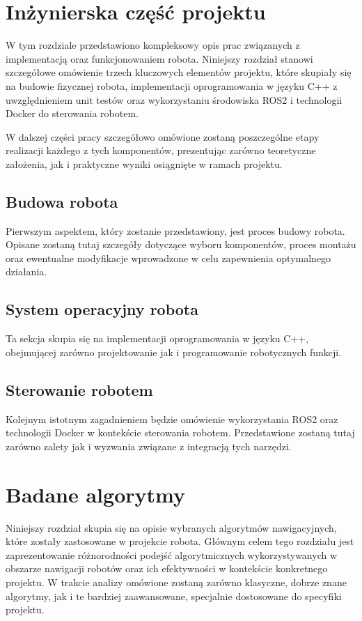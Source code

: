 \documentclass[12pt,twoside]{article}
\begin{document}
\section{Inżynierska część projektu}

W tym rozdziale przedstawiono kompleksowy opis prac związanych z implementacją oraz funkcjonowaniem robota. Niniejszy rozdział stanowi szczegółowe omówienie trzech kluczowych elementów projektu, które skupiały się na budowie fizycznej robota, implementacji oprogramowania w języku C++ z uwzględnieniem unit testów oraz wykorzystaniu środowiska ROS2 i technologii Docker do sterowania robotem.

W dalszej części pracy szczegółowo omówione zostaną poszczególne etapy realizacji każdego z tych komponentów, prezentując zarówno teoretyczne założenia, jak i praktyczne wyniki osiągnięte w ramach projektu.

\subsection{Budowa robota}

Pierwszym aspektem, który zostanie przedstawiony, jest proces budowy robota. Opisane zostaną tutaj szczegóły dotyczące wyboru komponentów, proces montażu oraz ewentualne modyfikacje wprowadzone w celu zapewnienia optymalnego działania.

\subsection{System operacyjny robota}

Ta sekcja skupia się na implementacji oprogramowania w języku C++, obejmującej zarówno projektowanie jak i programowanie robotycznych funkcji. 

\subsection{Sterowanie robotem}

Kolejnym istotnym zagadnieniem będzie omówienie wykorzystania ROS2 oraz technologii Docker w kontekście sterowania robotem. Przedstawione zostaną tutaj zarówno zalety jak i wyzwania związane z integracją tych narzędzi.

\section{Badane algorytmy}

Niniejszy rozdział skupia się na opisie wybranych algorytmów nawigacyjnych, które zostały zastosowane w projekcie robota. Głównym celem tego rozdziału jest zaprezentowanie różnorodności podejść algorytmicznych wykorzystywanych w obszarze nawigacji robotów oraz ich efektywności w kontekście konkretnego projektu. W trakcie analizy omówione zostaną zarówno klasyczne, dobrze znane algorytmy, jak i te bardziej zaawansowane, specjalnie dostosowane do specyfiki projektu.
\end{document}
